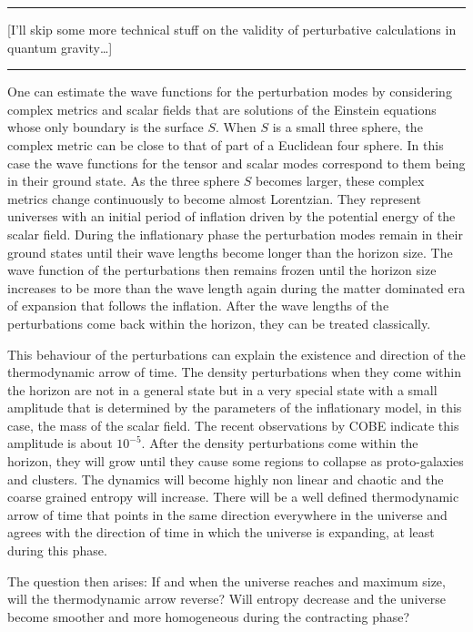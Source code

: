 \documentclass{article}
\begin{document}
\begin{center}\rule{0.5\linewidth}{0.5pt}\end{center}

{[}I'll skip some more technical stuff on the validity of perturbative
calculations in quantum gravity\ldots{]}

\begin{center}\rule{0.5\linewidth}{0.5pt}\end{center}

One can estimate the wave functions for the perturbation modes by
considering complex metrics and scalar fields that are solutions of the
Einstein equations whose only boundary is the surface \(S\). When \(S\)
is a small three sphere, the complex metric can be close to that of part
of a Euclidean four sphere. In this case the wave functions for the
tensor and scalar modes correspond to them being in their ground state.
As the three sphere \(S\) becomes larger, these complex metrics change
continuously to become almost Lorentzian. They represent universes with
an initial period of inflation driven by the potential energy of the
scalar field. During the inflationary phase the perturbation modes
remain in their ground states until their wave lengths become longer
than the horizon size. The wave function of the perturbations then
remains frozen until the horizon size increases to be more than the wave
length again during the matter dominated era of expansion that follows
the inflation. After the wave lengths of the perturbations come back
within the horizon, they can be treated classically.

This behaviour of the perturbations can explain the existence and
direction of the thermodynamic arrow of time. The density perturbations
when they come within the horizon are not in a general state but in a
very special state with a small amplitude that is determined by the
parameters of the inflationary model, in this case, the mass of the
scalar field. The recent observations by COBE indicate this amplitude is
about \(10^{-5}\). After the density perturbations come within the
horizon, they will grow until they cause some regions to collapse as
proto-galaxies and clusters. The dynamics will become highly non linear
and chaotic and the coarse grained entropy will increase. There will be
a well defined thermodynamic arrow of time that points in the same
direction everywhere in the universe and agrees with the direction of
time in which the universe is expanding, at least during this phase.

The question then arises: If and when the universe reaches and maximum
size, will the thermodynamic arrow reverse? Will entropy decrease and
the universe become smoother and more homogeneous during the contracting
phase?
\end{document}
